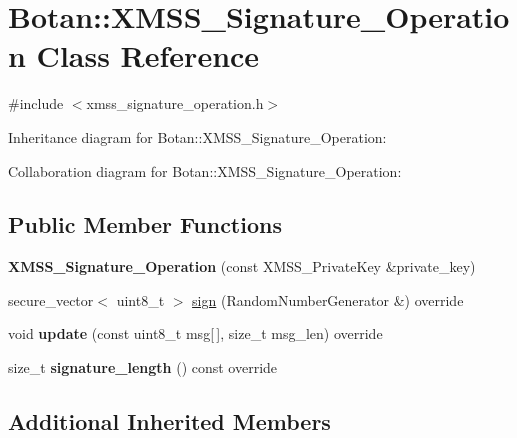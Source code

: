 \hypertarget{class_botan_1_1_x_m_s_s___signature___operation}{}\section{Botan\+:\+:X\+M\+S\+S\+\_\+\+Signature\+\_\+\+Operation Class Reference}
\label{class_botan_1_1_x_m_s_s___signature___operation}


{\ttfamily \#include $<$xmss\+\_\+signature\+\_\+operation.\+h$>$}



Inheritance diagram for Botan\+:\+:X\+M\+S\+S\+\_\+\+Signature\+\_\+\+Operation\+:


Collaboration diagram for Botan\+:\+:X\+M\+S\+S\+\_\+\+Signature\+\_\+\+Operation\+:
\subsection*{Public Member Functions}
\begin{DoxyCompactItemize}
\item 
\mbox{\label{class_botan_1_1_x_m_s_s___signature___operation_a011501f52593f3ecfc9c980749d8142b}} 
{\bfseries X\+M\+S\+S\+\_\+\+Signature\+\_\+\+Operation} (const X\+M\+S\+S\+\_\+\+Private\+Key \&private\+\_\+key)
\item 
secure\+\_\+vector$<$ uint8\+\_\+t $>$ \mbox{\hyperlink{class_botan_1_1_x_m_s_s___signature___operation_a358b62ab358d6d82ba3576821965983d}{sign}} (Random\+Number\+Generator \&) override
\item 
\mbox{\label{class_botan_1_1_x_m_s_s___signature___operation_a80604d5aa18973cd4377283aa5548b38}} 
void {\bfseries update} (const uint8\+\_\+t msg\mbox{[}$\,$\mbox{]}, size\+\_\+t msg\+\_\+len) override
\item 
\mbox{\label{class_botan_1_1_x_m_s_s___signature___operation_a32e69be9f7ea6a4f9077d5831c754cd8}} 
size\+\_\+t {\bfseries signature\+\_\+length} () const override
\end{DoxyCompactItemize}
\subsection*{Additional Inherited Members}


